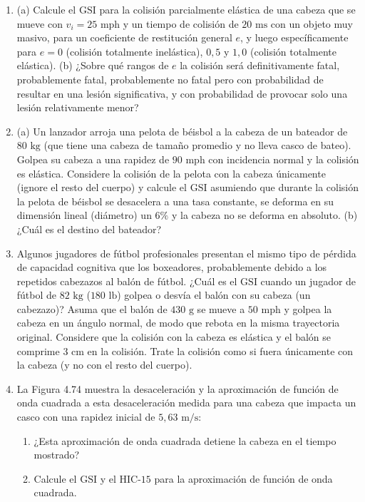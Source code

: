 \documentclass[12pt]{book}
\begin{document}
\begin{enumerate}
\item[3.138] (a) Calcule el $\text{GSI}$ para la colisión parcialmente elástica de una cabeza que se mueve con $v_i = 25\text{ mph}$ y un tiempo de colisión de $20\text{ ms}$ con un objeto muy masivo, para un coeficiente de restitución general $e$, y luego específicamente para $e = 0$ (colisión totalmente inelástica), $0{,}5$ y $1{,}0$ (colisión totalmente elástica).
\newline
(b) ¿Sobre qué rangos de $e$ la colisión será definitivamente fatal, probablemente fatal, probablemente no fatal pero con probabilidad de resultar en una lesión significativa, y con probabilidad de provocar solo una lesión relativamente menor?

\item[3.139] (a) Un lanzador arroja una pelota de béisbol a la cabeza de un bateador de $80\text{ kg}$ (que tiene una cabeza de tamaño promedio y no lleva casco de bateo). Golpea su cabeza a una rapidez de $90\text{ mph}$ con incidencia normal y la colisión es elástica. Considere la colisión de la pelota con la cabeza únicamente (ignore el resto del cuerpo) y calcule el $\text{GSI}$ asumiendo que durante la colisión la pelota de béisbol se desacelera a una tasa constante, se deforma en su dimensión lineal (diámetro) un $6\%$ y la cabeza no se deforma en absoluto.
\newline
(b) ¿Cuál es el destino del bateador?

\item[3.140] Algunos jugadores de fútbol profesionales presentan el mismo tipo de pérdida de capacidad cognitiva que los boxeadores, probablemente debido a los repetidos cabezazos al balón de fútbol. ¿Cuál es el $\text{GSI}$ cuando un jugador de fútbol de $82\text{ kg}$ ($180\text{ lb}$) golpea o desvía el balón con su cabeza (un cabezazo)? Asuma que el balón de $430\text{ g}$ se mueve a $50\text{ mph}$ y golpea la cabeza en un ángulo normal, de modo que rebota en la misma trayectoria original. Considere que la colisión con la cabeza es elástica y el balón se comprime $3\text{ cm}$ en la colisión. Trate la colisión como si fuera únicamente con la cabeza (y no con el resto del cuerpo).

\item[3.141] La Figura 4.74 muestra la desaceleración y la aproximación de función de onda cuadrada a esta desaceleración medida para una cabeza que impacta un casco con una rapidez inicial de $5{,}63\text{ m/s}$:
\begin{enumerate}
\item[(a)] ¿Esta aproximación de onda cuadrada detiene la cabeza en el tiempo mostrado?
\item[(b)] Calcule el $\text{GSI}$ y el $\text{HIC-15}$ para la aproximación de función de onda cuadrada.
\end{enumerate}


\end{enumerate}
\end{document}
